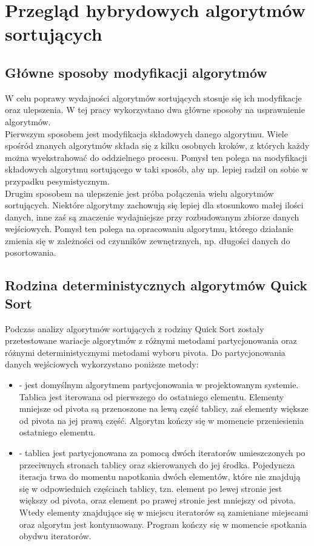 \chapter{Przegląd hybrydowych algorytmów sortujących}
\thispagestyle{chapterBeginStyle}

\section{Główne sposoby modyfikacji algorytmów}
W celu poprawy wydajności algorytmów sortujących stosuje się ich modyfikacje oraz ulepszenia. W tej pracy wykorzystano dwa główne sposoby na usprawnienie algorytmów.\\

Pierwszym sposobem jest modyfikacja składowych danego algorytmu. Wiele spośród znanych algorytmów składa się z kilku osobnych kroków, z których każdy można wyekstrahować do oddzielnego procesu. Pomysł ten polega na modyfikacji składowych algorytmu sortującego w taki sposób, aby np. lepiej radził on sobie w przypadku pesymistycznym.\\

Drugim sposobem na ulepszenie jest próba połączenia wielu algorytmów sortujących. Niektóre algorytmy zachowują się lepiej dla stosunkowo małej ilości danych, inne zaś są znaczenie wydajniejsze przy rozbudowanym zbiorze danych wejściowych. Pomysł ten polega na opracowaniu algorytmu, którego działanie zmienia się w zależności od czynników zewnętrznych, np. długości danych do posortowania.\\

\section{Rodzina deterministycznych algorytmów Quick Sort}
Podczas analizy algorytmów sortujących z rodziny Quick Sort zostały przetestowane wariacje algorytmów z różnymi metodami partycjonowania oraz różnymi deterministycznymi metodami wyboru pivota. Do partycjonowania danych wejściowych wykorzystano poniższe metody:

\begin{itemize}
	\setlength\itemsep{0em}
	\item {} - jest domyślnym algorytmem partycjonowania w projektowanym systemie. Tablica jest iterowana od pierwszego do ostatniego elementu. Elementy mniejsze od pivota są przenoszone na lewą część tablicy, zaś elementy większe od pivota na jej prawą część. Algorytm kończy się w momencie przeniesienia ostatniego elementu.
	\item {} - tablica jest partycjonowana za pomocą dwóch iteratorów umieszczonych po przeciwnych stronach tablicy oraz skierowanych do jej środka. Pojedyncza iteracja trwa do momentu napotkania dwóch elementów, które nie znajdują się w odpowiednich częściach tablicy, tzn. element po lewej stronie jest większy od pivota, oraz element po prawej stronie jest mniejszy od pivota. Wtedy elementy znajdujące się w miejscu iteratorów są zamieniane miejscami oraz algorytm jest kontynuowany. Program kończy się w momencie spotkania obydwu iteratorów.
\end{itemize}

